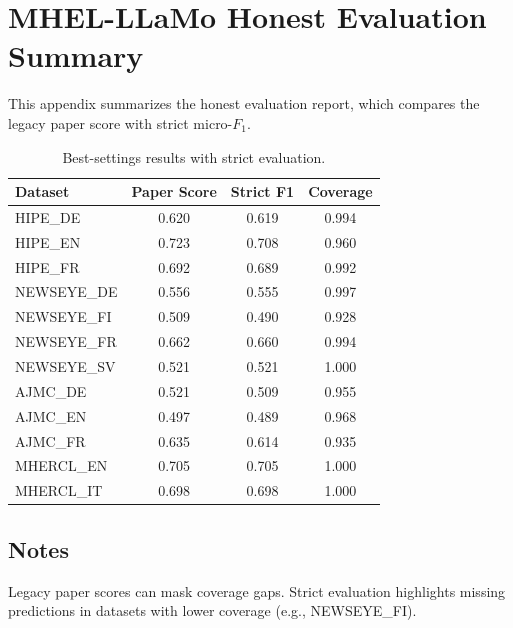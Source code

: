 \chapter{MHEL-LLaMo Honest Evaluation Summary}
\label{AppendixC}

This appendix summarizes the honest evaluation report, which compares the legacy paper score with strict micro-$F_1$.

\begin{table}[ht]
\centering
\caption{Best-settings results with strict evaluation.}
\begin{tabular}{lccc}
\hline
Dataset & Paper Score & Strict F1 & Coverage \\
\hline
HIPE\_DE & 0.620 & 0.619 & 0.994 \\
HIPE\_EN & 0.723 & 0.708 & 0.960 \\
HIPE\_FR & 0.692 & 0.689 & 0.992 \\
NEWSEYE\_DE & 0.556 & 0.555 & 0.997 \\
NEWSEYE\_FI & 0.509 & 0.490 & 0.928 \\
NEWSEYE\_FR & 0.662 & 0.660 & 0.994 \\
NEWSEYE\_SV & 0.521 & 0.521 & 1.000 \\
AJMC\_DE & 0.521 & 0.509 & 0.955 \\
AJMC\_EN & 0.497 & 0.489 & 0.968 \\
AJMC\_FR & 0.635 & 0.614 & 0.935 \\
MHERCL\_EN & 0.705 & 0.705 & 1.000 \\
MHERCL\_IT & 0.698 & 0.698 & 1.000 \\
\hline
\end{tabular}
\end{table}

\section{Notes}
Legacy paper scores can mask coverage gaps. Strict evaluation highlights missing predictions in datasets with lower coverage (e.g., NEWSEYE\_FI).
